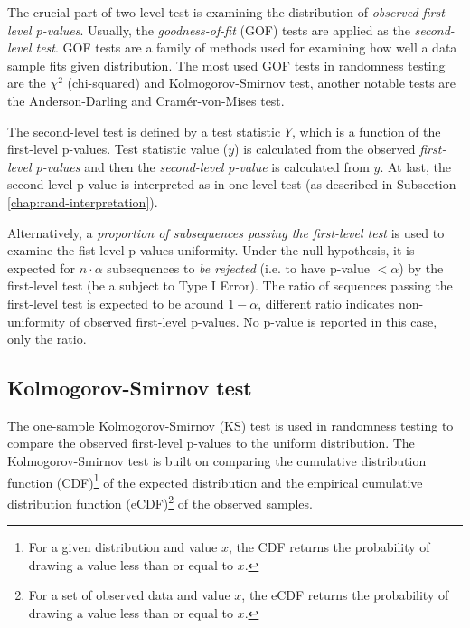 \documentclass[
  digital,     %
  oneside,     %
  nosansbold,  %
  nocolorbold, %
  nolof,         %
  nolot,         %
]{fithesis4}
\begin{document}
The crucial part of two-level test is examining the distribution of \emph{observed first-level p-values}. Usually, the \emph{goodness-of-fit} (GOF) tests are applied as the \emph{second-level test}. \cite[p. 6]{tu01_paper} GOF tests are a family of methods used for examining how well a data sample fits given distribution. \cite[p. 1]{GOF-techniques} The most used GOF tests in randomness testing are the $\chi^2$ (chi-squared) and Kolmogorov-Smirnov test, another notable tests are the Anderson-Darling and Cramér-von-Mises test. \cite[p. 14]{bad_day}

The second-level test is defined by a test statistic $Y$, which is a function of the first-level p-values. Test statistic value ($y$) is calculated from the observed \emph{first-level p-values} and then the \emph{second-level p-value} is calculated from $y$. At last, the second-level p-value is interpreted as in one-level test (as described in Subsection \ref{chap:rand-interpretation}). 

Alternatively, a \emph{proportion of subsequences passing the first-level test} is used to examine the fist-level p-values uniformity. Under the null-hypothesis, it is expected for $n\cdot\alpha$ subsequences to \emph{be rejected} (i.e. to have p-value $< \alpha$) by the first-level test (be a subject to Type I Error). The ratio of sequences passing the first-level test is expected to be around $1-\alpha$, different ratio indicates non-uniformity of observed first-level p-values. \cite[p. 4-2]{nist_special} No p-value is reported in this case, only the ratio.


\subsection{Kolmogorov-Smirnov test}
The one-sample Kolmogorov-Smirnov (KS) test is used in randomness testing to compare the observed first-level p-values to the uniform distribution. The Kolmogorov-Smirnov test is built on comparing the cumulative distribution function (CDF)\footnote{For a given distribution and value $x$, the CDF returns the probability of drawing a value less than or equal to $x$.} of the expected distribution and the empirical cumulative distribution function (eCDF)\footnote{For a set of observed data and value $x$, the eCDF returns the probability of drawing a value less than or equal to $x$.} of the observed samples. %
\end{document}
